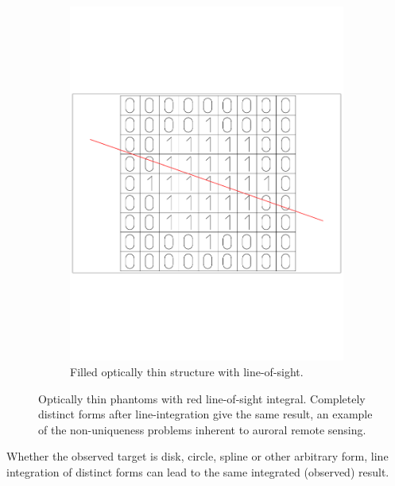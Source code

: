 \begin{figure}
\begin{subfigure}[t]{0.45\linewidth}
        \includegraphics[width=\linewidth,trim=50 200 50 200,clip]{gfx/disk}
        \caption{Filled optically thin structure with line-of-sight.}		
    \end{subfigure}
    \caption{Optically thin phantoms with red line-of-sight integral. Completely distinct forms after line-integration give the same result, an example of the non-uniqueness problems inherent to auroral remote sensing.}\label{fig:bint}
\end{figure}
Whether the observed target is disk, circle, spline or other arbitrary form, line integration of distinct forms can lead to the same integrated (observed) result.

